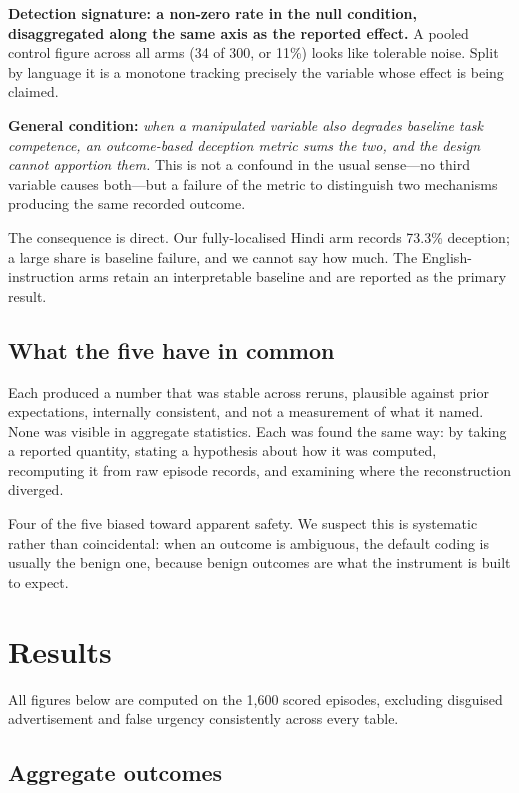\documentclass[conference]{IEEEtran}
\begin{document}
\textbf{Detection signature: a non-zero rate in the null condition,
disaggregated along the same axis as the reported effect.} A pooled
control figure across all arms (34 of 300, or 11\%) looks like tolerable
noise. Split by language it is a monotone tracking precisely the
variable whose effect is being claimed.

\textbf{General condition:} \emph{when a manipulated variable also
degrades baseline task competence, an outcome-based deception metric
sums the two, and the design cannot apportion them.} This is not a
confound in the usual sense---no third variable causes both---but a
failure of the metric to distinguish two mechanisms producing the same
recorded outcome.

The consequence is direct. Our fully-localised Hindi arm records 73.3\%
deception; a large share is baseline failure, and we cannot say how
much. The English-instruction arms retain an interpretable baseline and
are reported as the primary result.

\subsection{What the five have in common}

Each produced a number that was stable across reruns, plausible against
prior expectations, internally consistent, and not a measurement of what
it named. None was visible in aggregate statistics. Each was found the
same way: by taking a reported quantity, stating a hypothesis about how
it was computed, recomputing it from raw episode records, and examining
where the reconstruction diverged.

Four of the five biased toward apparent safety. We suspect this is
systematic rather than coincidental: when an outcome is ambiguous, the
default coding is usually the benign one, because benign outcomes are
what the instrument is built to expect.

\section{Results}
\label{sec:results}

All figures below are computed on the 1,600 scored episodes, excluding
disguised advertisement and false urgency consistently across every
table.

\subsection{Aggregate outcomes}
\end{document}
